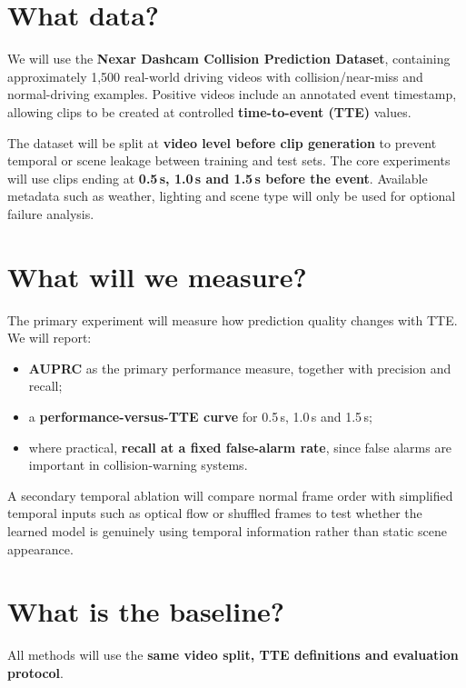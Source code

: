 \documentclass[10pt,a4paper]{article}
\begin{document}
\section{What data?}

We will use the \textbf{Nexar Dashcam Collision Prediction Dataset}, containing approximately 1,500 real-world driving videos with collision/near-miss and normal-driving examples. Positive videos include an annotated event timestamp, allowing clips to be created at controlled \textbf{time-to-event (TTE)} values.

The dataset will be split at \textbf{video level before clip generation} to prevent temporal or scene leakage between training and test sets. The core experiments will use clips ending at \textbf{0.5\,s, 1.0\,s and 1.5\,s before the event}. Available metadata such as weather, lighting and scene type will only be used for optional failure analysis.

\section{What will we measure?}

The primary experiment will measure how prediction quality changes with TTE. We will report:
\begin{itemize}
  \item \textbf{AUPRC} as the primary performance measure, together with precision and recall;
  \item a \textbf{performance-versus-TTE curve} for 0.5\,s, 1.0\,s and 1.5\,s;
  \item where practical, \textbf{recall at a fixed false-alarm rate}, since false alarms are important in collision-warning systems.
\end{itemize}

A secondary temporal ablation will compare normal frame order with simplified temporal inputs such as optical flow or shuffled frames to test whether the learned model is genuinely using temporal information rather than static scene appearance.

\section{What is the baseline?}

All methods will use the \textbf{same video split, TTE definitions and evaluation protocol}.
\end{document}

